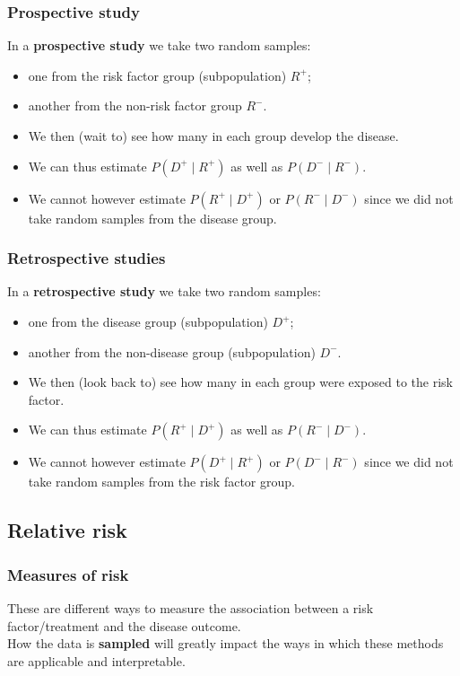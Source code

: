 \documentclass[a4paper]{article}
\begin{document}
\subsubsection{Prospective study}
In a \textbf{prospective study} we take two random samples:
\begin{itemize}
	\item one from the risk factor group (subpopulation) \( R^+ \);
	\item another from the non-risk factor group \( R^- \).
	\item We then (wait to) see how many in each group develop the disease.
	\item We can thus estimate \( P(D^+ \mid R^+) \) as well as \( P(D^- \mid R^-) \).
	\item We cannot however estimate \( P(R^+ \mid D^+) \) or \( P(R^- \mid D^-) \) since we did not take random samples from the disease group.
\end{itemize}
\subsubsection{Retrospective studies}
In a \textbf{retrospective study} we take two random samples:
\begin{itemize}
	\item one from the disease group (subpopulation) \( D^+ \);
	\item another from the non-disease group (subpopulation) \( D^- \).
	\item We then (look back to) see how many in each group were exposed to the risk factor.
	\item We can thus estimate \( P(R^+ \mid D^+) \) as well as \( P(R^- \mid D^-) \).
	\item We cannot however estimate \( P(D^+ \mid R^+) \) or \( P(D^- \mid R^-) \) since we did not take random samples from the risk factor group.
\end{itemize}
\subsection{Relative risk}
\subsubsection{Measures of risk}
These are different ways to measure the association between a risk factor/treatment and the disease outcome.\\
How the data is \textbf{sampled} will greatly impact the ways in which these methods are applicable and interpretable.
\end{document}
